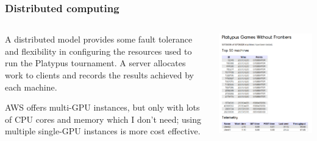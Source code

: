 \documentclass[aspectratio=169]{beamer}
\begin{document}
\begin{frame}
  \frametitle{Distributed computing}
  \begin{columns}
    \begin{column}{0.5\textwidth}
      A distributed model provides some fault tolerance
      and flexibility in configuring the resources used to run
      the Platypus tournament. A server allocates work to
      clients and records the results achieved by each machine.

       AWS offers multi-GPU instances, but only with
       lots of CPU cores and memory which I don't need;
       using multiple single-GPU instances is more cost
       effective.
    \end{column}
    \begin{column}{0.5\textwidth}
      \includegraphics[width=\textwidth]{control.png}
    \end{column}
  \end{columns}
\end{frame}
\end{document}
